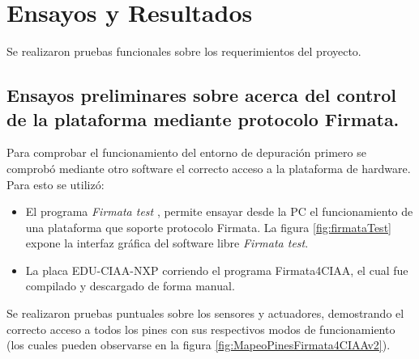 
\chapter{Ensayos y Resultados} %

\label{Chapter4} %


Se realizaron pruebas funcionales sobre los requerimientos del proyecto.

\section{Ensayos preliminares sobre acerca del control de la plataforma mediante protocolo Firmata.}
\label{sec:Ensayos de control de la plataforma mediante protocolo Firmata}

Para comprobar el funcionamiento del entorno de depuración primero se comprobó mediante otro software el correcto acceso a la plataforma de hardware. Para esto se utilizó:

\begin{itemize}
	\item El programa \emph{Firmata test} \citep{firmataTest}, permite ensayar desde la PC el funcionamiento de una plataforma que soporte protocolo Firmata. La figura \ref{fig:firmataTest} expone la interfaz gráfica del software libre \emph{Firmata test}.
	\item La placa EDU-CIAA-NXP corriendo el programa Firmata4CIAA, el cual fue compilado y descargado de forma manual.
\end{itemize}

Se realizaron pruebas puntuales sobre los sensores y actuadores, demostrando el correcto acceso a todos los pines con sus respectivos modos de funcionamiento (los cuales pueden observarse en la figura \ref{fig:MapeoPinesFirmata4CIAAv2}). 

